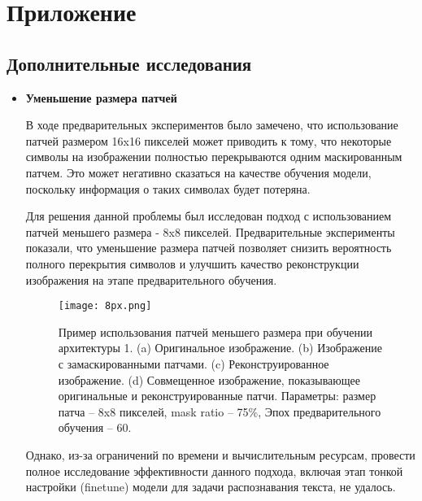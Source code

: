 \section*{Приложение}
\label{sec:Apendix} 

\subsection{Дополнительные исследования}

\begin{itemize}
    \item \textbf{Уменьшение размера патчей}

    В ходе предварительных экспериментов было замечено, что использование патчей размером 16x16 пикселей может приводить к тому, что некоторые символы на изображении полностью перекрываются одним маскированным патчем. Это может негативно сказаться на качестве обучения модели, поскольку информация о таких символах будет потеряна. 

    Для решения данной проблемы был исследован подход с использованием патчей меньшего размера - 8x8 пикселей. Предварительные эксперименты показали, что уменьшение размера патчей позволяет снизить вероятность полного перекрытия символов и улучшить качество реконструкции изображения на этапе предварительного обучения. 
    \begin{figure}[H]
        \texttt{[image: 8px.png]}
        \caption{Пример использования патчей меньшего размера при обучении архитектуры 1. (a) Оригинальное изображение. (b) Изображение с замаскированными патчами. (c) Реконструированное изображение. (d) Совмещенное изображение, показывающее оригинальные и реконструированные патчи. Параметры: размер патча – 8x8 пикселей, mask ratio – 75\%,  Эпох предварительного обучения – 60.}
    \end{figure}
    Однако, из-за ограничений по времени и вычислительным ресурсам, провести полное исследование эффективности данного подхода, включая этап тонкой настройки (finetune) модели для задачи распознавания текста, не удалось.  
\end{itemize}